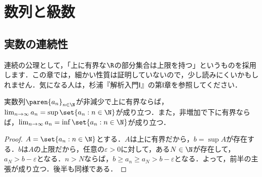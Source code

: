 \documentclass[a4paper,10pt]{ltjsarticle}
\begin{document}
\section{数列と級数}
\label{sec:sequence_series}

\subsection{実数の連続性}
\label{sec:continuity_R}

連続の公理として，「上に有界な\(\R\)の部分集合は上限を持つ」というものを採用します．この章では，細かい性質は証明していないので，少し読みにくいかもしれません．気になる人は，杉浦『解析入門Ⅰ』の第Ⅰ章を参照してください．

\begin{MyTheorem}
  実数列\(\paren{a_n}_{n\in\N}\)が非減少で上に有界ならば，\(\lim_{n\to\infty}a_n=\sup\set{a_n:n\in\N}\)が成り立つ．また，非増加で下に有界ならば，\(\lim_{n\to\infty}a_n=\inf\set{a_n:n\in\N}\)が成り立つ．
\end{MyTheorem}
\begin{proof}
  \(A=\set{a_n:n\in\N}\)とする．\(A\)は上に有界だから，\(b=\sup A\)が存在する．\(b\)は\(A\)の上限だから，任意の\(\varepsilon > 0\)に対して，ある\(N \in \N\)が存在して，\(a_N > b - \varepsilon\)となる．\(n > N\)ならば，\(b \ge a_n \ge a_N > b - \varepsilon\)となる．よって，前半の主張が成り立つ．後半も同様である．
\end{proof}
\end{document}
